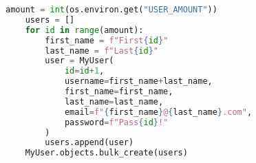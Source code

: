 \begin{lstlisting}[language=Python,caption={Populating django \acrshort{db}},breaklines=true,label={lst:djangoSeedDb}]
    amount = int(os.environ.get("USER_AMOUNT"))
    users = []
    for id in range(amount):
        first_name = f"First{id}"
        last_name = f"Last{id}"
        user = MyUser(
            id=id+1,
            username=first_name+last_name,
            first_name=first_name,
            last_name=last_name,
            email=f"{first_name}@{last_name}.com",
            password=f"Pass{id}!"
        )
        users.append(user)
    MyUser.objects.bulk_create(users)
\end{lstlisting}
